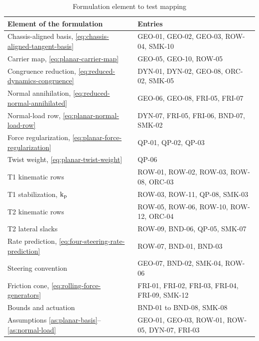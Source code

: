 \documentclass[10pt]{article}
\begin{document}
\begin{table}[h]
  \centering
  \caption{Formulation element to test mapping}
  \label{tab:test-traceability}
  \begin{tabular}{|C{0.34\columnwidth}|C{0.54\columnwidth}|}
    \hline
    Element of the formulation & Entries \\
    \hline
    Chassis-aligned basis, \eqref{eq:chassis-aligned-tangent-basis} &
      GEO-01, GEO-02, GEO-03, ROW-04, SMK-10 \\
    \hline
    Carrier map, \eqref{eq:planar-carrier-map} &
      GEO-05, GEO-10, ROW-05 \\
    \hline
    Congruence reduction, \eqref{eq:reduced-dynamics-congruence} &
      DYN-01, DYN-02, GEO-08, ORC-02, SMK-05 \\
    \hline
    Normal annihilation, \eqref{eq:reduced-normal-annihilated} &
      GEO-06, GEO-08, FRI-05, FRI-07 \\
    \hline
    Normal-load row, \eqref{eq:planar-normal-load-row} &
      DYN-07, FRI-05, FRI-06, BND-07, SMK-02 \\
    \hline
    Force regularization, \eqref{eq:planar-force-regularization} &
      QP-01, QP-02, QP-03 \\
    \hline
    Twist weight, \eqref{eq:planar-twist-weight} &
      QP-06 \\
    \hline
    T1 kinematic rows &
      ROW-01, ROW-02, ROW-03, ROW-08, ORC-03 \\
    \hline
    T1 stabilization, $\text{k}_{\text{p}}$ &
      ROW-03, ROW-11, QP-08, SMK-03 \\
    \hline
    T2 kinematic rows &
      ROW-05, ROW-06, ROW-10, ROW-12, ORC-04 \\
    \hline
    T2 lateral slacks &
      ROW-09, BND-06, QP-05, SMK-07 \\
    \hline
    Rate prediction, \eqref{eq:four-steering-rate-prediction} &
      ROW-07, BND-01, BND-03 \\
    \hline
    Steering convention &
      GEO-07, BND-02, SMK-04, ROW-06 \\
    \hline
    Friction cone, \eqref{eq:rolling-force-generators} &
      FRI-01, FRI-02, FRI-03, FRI-04, FRI-09, SMK-12 \\
    \hline
    Bounds and actuation &
      BND-01 to BND-08, SMK-08 \\
    \hline
    Assumptions \ref{as:planar-basis}--\ref{as:normal-load} &
      GEO-01, GEO-03, ROW-01, ROW-05, DYN-07, FRI-03 \\
    \hline
  \end{tabular}
\end{table}
\end{document}
